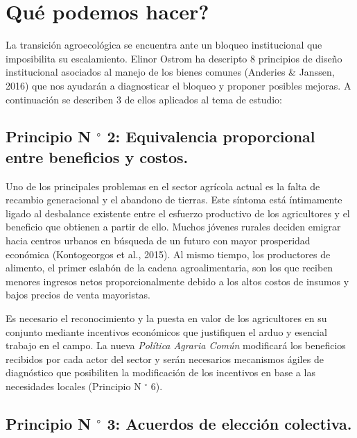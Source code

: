 \documentclass[a4paper, nobind]{templates/ociamthesis}
\begin{document}
\hypertarget{quuxe9-podemos-hacer}{%
\section{\texorpdfstring{\textquestiondown Qué podemos hacer?}{Qué podemos hacer?}}\label{quuxe9-podemos-hacer}}

La transición agroecológica se encuentra ante un bloqueo institucional que imposibilita su escalamiento.
Elinor Ostrom ha descripto 8 principios de diseño institucional asociados al manejo de los bienes comunes (Anderies \& Janssen, 2016) que nos ayudarán a diagnosticar el bloqueo y proponer posibles mejoras.
A continuación se describen 3 de ellos aplicados al tema de estudio:

\hypertarget{principio-n-circ-2-equivalencia-proporcional-entre-beneficios-y-costos.}{%
\subsection{\texorpdfstring{Principio N \(^{\circ}\) 2: Equivalencia proporcional entre beneficios y costos.}{Principio N \^{}\{\textbackslash circ\} 2: Equivalencia proporcional entre beneficios y costos.}}\label{principio-n-circ-2-equivalencia-proporcional-entre-beneficios-y-costos.}}

Uno de los principales problemas en el sector agrícola actual es la falta de recambio generacional y el abandono de tierras.
Este síntoma está íntimamente ligado al desbalance existente entre el esfuerzo productivo de los agricultores y el beneficio que obtienen a partir de ello.
Muchos jóvenes rurales deciden emigrar hacia centros urbanos en búsqueda de un futuro con mayor prosperidad económica (Kontogeorgos et al., 2015).
Al mismo tiempo, los productores de alimento, el primer eslabón de la cadena agroalimentaria, son los que reciben menores ingresos netos proporcionalmente debido a los altos costos de insumos y bajos precios de venta mayoristas.

Es necesario el reconocimiento y la puesta en valor de los agricultores en su conjunto mediante incentivos económicos que justifiquen el arduo y esencial trabajo en el campo.
La nueva \emph{Política Agraria Común} modificará los beneficios recibidos por cada actor del sector y serán necesarios mecanismos ágiles de diagnóstico que posibiliten la modificación de los incentivos en base a las necesidades locales (Principio N \(^{\circ}\) 6).

\hypertarget{principio-n-circ-3-acuerdos-de-elecciuxf3n-colectiva.}{%
\subsection{\texorpdfstring{Principio N \(^{\circ}\) 3: Acuerdos de elección colectiva.}{Principio N \^{}\{\textbackslash circ\} 3: Acuerdos de elección colectiva.}}\label{principio-n-circ-3-acuerdos-de-elecciuxf3n-colectiva.}}
\end{document}
